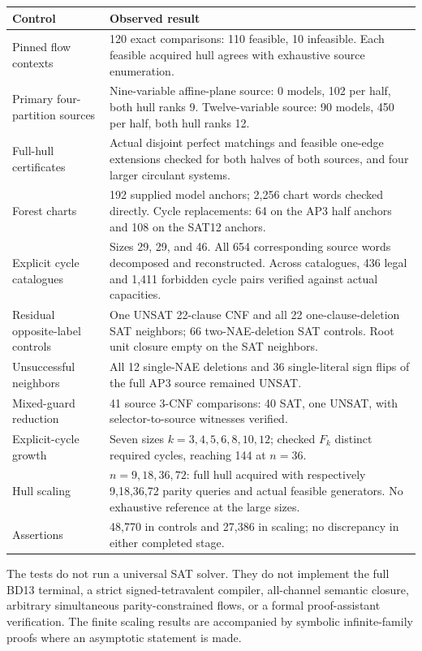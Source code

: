 \documentclass[11pt,letterpaper]{article}
\theoremstyle{definition}
\begin{document}
\begin{longtable}{p{}p{}}
\toprule
Control & Observed result\\
\midrule
\endhead
Pinned flow contexts & 120 exact comparisons: 110 feasible, 10 infeasible. Each feasible acquired hull agrees with exhaustive source enumeration.\\
Primary four-partition sources & Nine-variable affine-plane source: 0 models, 102 per half, both hull ranks 9. Twelve-variable source: 90 models, 450 per half, both hull ranks 12.\\
Full-hull certificates & Actual disjoint perfect matchings and feasible one-edge extensions checked for both halves of both sources, and four larger circulant systems.\\
Forest charts & 192 supplied model anchors; 2,256 chart words checked directly. Cycle replacements: 64 on the AP3 half anchors and 108 on the SAT12 anchors.\\
Explicit cycle catalogues & Sizes 29, 29, and 46. All 654 corresponding source words decomposed and reconstructed. Across catalogues, 436 legal and 1,411 forbidden cycle pairs verified against actual capacities.\\
Residual opposite-label controls & One UNSAT 22-clause CNF and all 22 one-clause-deletion SAT neighbors; 66 two-NAE-deletion SAT controls. Root unit closure empty on the SAT neighbors.\\
Unsuccessful neighbors & All 12 single-NAE deletions and 36 single-literal sign flips of the full AP3 source remained UNSAT.\\
Mixed-guard reduction & 41 source 3-CNF comparisons: 40 SAT, one UNSAT, with selector-to-source witnesses verified.\\
Explicit-cycle growth & Seven sizes $k=3,4,5,6,8,10,12$; checked $F_k$ distinct required cycles, reaching 144 at $n=36$.\\
Hull scaling & $n=9,18,36,72$: full hull acquired with respectively 9,18,36,72 parity queries and actual feasible generators. No exhaustive reference at the large sizes.\\
Assertions & 48,770 in controls and 27,386 in scaling; no discrepancy in either completed stage.\\
\bottomrule
\end{longtable}

The tests do not run a universal SAT solver. They do not implement the full BD13 terminal, a strict signed-tetravalent compiler, all-channel semantic closure, arbitrary simultaneous parity-constrained flows, or a formal proof-assistant verification. The finite scaling results are accompanied by symbolic infinite-family proofs where an asymptotic statement is made.
\end{document}
